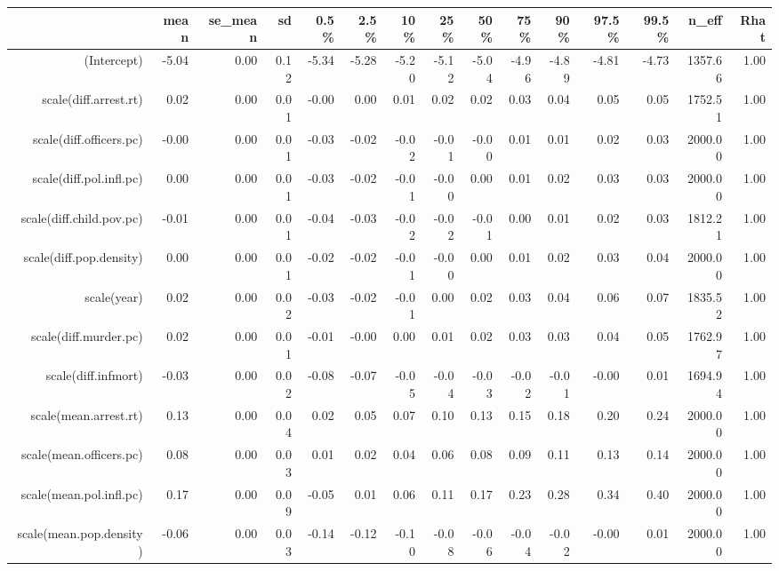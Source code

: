 \begin{table}[ht]
\centering
\begin{tabular}{rrrrrrrrrrrrrrr}
  \hline
 & mean & se\_mean & sd & 0.5\% & 2.5\% & 10\% & 25\% & 50\% & 75\% & 90\% & 97.5\% & 99.5\% & n\_eff & Rhat \\ 
  \hline
(Intercept) & -5.04 & 0.00 & 0.12 & -5.34 & -5.28 & -5.20 & -5.12 & -5.04 & -4.96 & -4.89 & -4.81 & -4.73 & 1357.66 & 1.00 \\ 
  scale(diff.arrest.rt) & 0.02 & 0.00 & 0.01 & -0.00 & 0.00 & 0.01 & 0.02 & 0.02 & 0.03 & 0.04 & 0.05 & 0.05 & 1752.51 & 1.00 \\ 
  scale(diff.officers.pc) & -0.00 & 0.00 & 0.01 & -0.03 & -0.02 & -0.02 & -0.01 & -0.00 & 0.01 & 0.01 & 0.02 & 0.03 & 2000.00 & 1.00 \\ 
  scale(diff.pol.infl.pc) & 0.00 & 0.00 & 0.01 & -0.03 & -0.02 & -0.01 & -0.00 & 0.00 & 0.01 & 0.02 & 0.03 & 0.03 & 2000.00 & 1.00 \\ 
  scale(diff.child.pov.pc) & -0.01 & 0.00 & 0.01 & -0.04 & -0.03 & -0.02 & -0.02 & -0.01 & 0.00 & 0.01 & 0.02 & 0.03 & 1812.21 & 1.00 \\ 
  scale(diff.pop.density) & 0.00 & 0.00 & 0.01 & -0.02 & -0.02 & -0.01 & -0.00 & 0.00 & 0.01 & 0.02 & 0.03 & 0.04 & 2000.00 & 1.00 \\ 
  scale(year) & 0.02 & 0.00 & 0.02 & -0.03 & -0.02 & -0.01 & 0.00 & 0.02 & 0.03 & 0.04 & 0.06 & 0.07 & 1835.52 & 1.00 \\ 
  scale(diff.murder.pc) & 0.02 & 0.00 & 0.01 & -0.01 & -0.00 & 0.00 & 0.01 & 0.02 & 0.03 & 0.03 & 0.04 & 0.05 & 1762.97 & 1.00 \\ 
  scale(diff.infmort) & -0.03 & 0.00 & 0.02 & -0.08 & -0.07 & -0.05 & -0.04 & -0.03 & -0.02 & -0.01 & -0.00 & 0.01 & 1694.94 & 1.00 \\ 
  scale(mean.arrest.rt) & 0.13 & 0.00 & 0.04 & 0.02 & 0.05 & 0.07 & 0.10 & 0.13 & 0.15 & 0.18 & 0.20 & 0.24 & 2000.00 & 1.00 \\ 
  scale(mean.officers.pc) & 0.08 & 0.00 & 0.03 & 0.01 & 0.02 & 0.04 & 0.06 & 0.08 & 0.09 & 0.11 & 0.13 & 0.14 & 2000.00 & 1.00 \\ 
  scale(mean.pol.infl.pc) & 0.17 & 0.00 & 0.09 & -0.05 & 0.01 & 0.06 & 0.11 & 0.17 & 0.23 & 0.28 & 0.34 & 0.40 & 2000.00 & 1.00 \\ 
  scale(mean.pop.density) & -0.06 & 0.00 & 0.03 & -0.14 & -0.12 & -0.10 & -0.08 & -0.06 & -0.04 & -0.02 & -0.00 & 0.01 & 2000.00 & 1.00 \\ 

\end{tabular}
\end{table}
